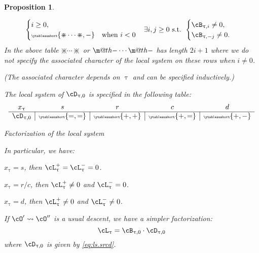 \documentclass[12pt,a4paper]{amsart}
\makeatletter
\numberwithin{equation}{section}
\newtheorem{prop}[thm]{Proposition}
\theoremstyle{remark}
\let\ytb=\ytableaushort
\newcommand{\tytb}[1]{{\tiny\ytb{#1}}}
\newcommand{\dotminus}{\mathbin{\text{\@dotminus}}}
\newcommand{\@dotminus}{%
  \ooalign{\hidewidth\raise1ex\hbox{.}\hidewidth\cr$\m@th-$\cr}%
}
\def\cOp{\cO^{\prime}}
\def\cOpp{\cO^{\prime\prime}}
\def\pcL{\cL^+}
\def\ncL{\cL^-}
\def\uum{{\dotminus}}
\def\uup{\divideontimes}
\makeatother
\begin{document}
\begin{prop}
\begin{enumS}
\begin{table}[pb]
\[\begin{array}{c|c|c|c}
\begin{cases}
{                                    } i\geq 0,\\
                                    \tytb{\uup\cdots\uup,-} & \text{when }i <0
                                  \end{cases}
                                  &  \exists i,j\geq 0 \text{ s.t. }
                                    \begin{cases}
                                      \cB_{\uptau,i}\neq 0,\\%
                                      \cB_{\uptau,-j}\neq 0.%
                                    \end{cases}

      \end{array}
    \]
  In the above table $\uup\cdots\uup$ or $\uum\cdots\uum$ has length $2i+1$
  where we do not specify the associated character of the local system on these rows when $i\neq 0$.

  (The associated character depends on $\uptau$ and can be
  specified inductively.)

  The local system of $\cD_{\uptau,0}$ is specified in the following
  table:
  \begin{equation}\label{eq:ls.srcd}
   \begin{array}{c|c|c|c|c}
      x_{\uptau} &  s & r & c &d \\
      \hline
      \cD_{\uptau,0} & \tiny \tytb{=,=} &\tiny \tytb{+,+} & \tiny \tytb{+,=} &\tiny \tytb{+,-}
    \end{array}
  \end{equation}
    \caption{Factorization of the local system}
    \label{tab:ls.factor}
    \label{eq:ls.factor}
  \end{table}
  \item
  In particular, we have:
  \begin{enumT}
    \item $x_{\uptau} = s$, then $\pcL_{\uptau} = \ncL_{\uptau} = 0$.
    \item $x_{\uptau} = r/c$, then $\pcL_{\uptau} \neq 0$ and $\ncL_{\uptau}=0$.
    \item $x_{\uptau} = d$, then $\pcL_{\uptau}\neq 0$ and $\ncL_{\uptau}\neq 0$.
  \end{enumT}
  \item If $\cOp \leadsto \cOpp$ is a usual descent, we have a simpler
  factorization:
  \begin{equation}\label{eq:d.factor}
    \cL_{\uptau} = \cB_{\uptau,0}\cdot \cD_{\uptau,0}
  \end{equation}
  where $\cD_{\uptau,0}$ is given by \eqref{eq:ls.srcd}.


\end{enumS}
\end{prop}
\end{document}
